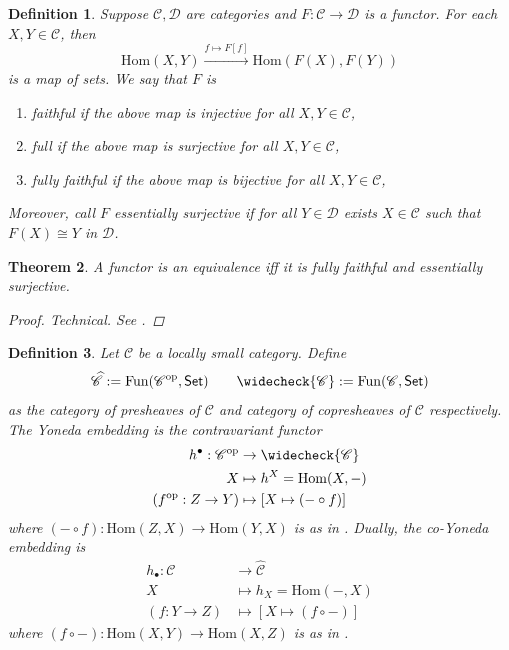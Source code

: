 \documentclass[10pt]{book}
\theoremstyle{bookplain}
\newtheorem{theorem}{Theorem}[section]
\theoremstyle{bookdefinition}
\newtheorem{definition}[theorem]{Definition}
\theoremstyle{bookremark}
\begin{document}
\begin{definition}Suppose $\mathscr{C}, \mathscr{D}$ are categories and $F:\mathscr{C}\rightarrow \mathscr{D}$ is a functor. 
    For each $X,Y\in\mathscr{C}$, then
    \[\mathrm{Hom}(X,Y)\xrightarrow{f\mapsto F[f]} \mathrm{Hom}(F(X),F(Y))\]
    is a map of sets. We say that $F$ is 
    \begin{enumerate}
        \item \textit{faithful} if the above map is injective for all $X,Y\in\mathscr{C}$,
        \item \textit{full} if the above map is surjective for all $X,Y\in\mathscr{C}$,
        \item \textit{fully faithful} if the above map is bijective for all $X,Y\in\mathscr{C}$,
    \end{enumerate}
    Moreover, call $F$ \textit{essentially surjective} if for all $Y\in \mathscr{D}$ exists $X\in\mathscr{C}$ such that $F(X)\cong Y$ in $\mathscr{D}$. 
\end{definition}
\begin{theorem}A functor is an equivalence iff it is fully faithful and essentially surjective. 
    \begin{proof}
        Technical. See \cite[Thm.~1.3.13, p.~22]{KashiwaraSchapira2006}.
    \end{proof}
\end{theorem}

\begin{definition}Let $\mathscr{C}$ be a locally small category. Define 
    \[\widehat{\mathscr{C}}:=\mathrm{Fun}(\mathscr{C}^{\mathrm{op}},\mathsf{Set})\qquad\widecheck{\mathscr{C}}:=\mathrm{Fun}(\mathscr{C},\mathsf{Set})\] 
    as the \textit{category of presheaves} of $\mathscr{C}$ and \textit{category of copresheaves} of $\mathscr{C}$ respectively.
    The \textit{Yoneda embedding} is the contravariant functor 
    \[\begin{aligned}
        h^{\bullet}:\mathscr{C}^{\mathrm{op}}&\rightarrow \widecheck{\mathscr{C}}\\
        X&\mapsto h^X=\mathrm{Hom}(X,-)\\
        (f^{\mathrm{op}}:Z\rightarrow Y)&\mapsto \left[X\mapsto (-\circ f)\right]
    \end{aligned}\]
    where $(-\circ f):\mathrm{Hom}(Z,X)\rightarrow \mathrm{Hom}(Y,X)$ is as in . 
    Dually, the \textit{co-Yoneda embedding} is
    \[\begin{aligned}
        h_{\bullet}:\mathscr{C}&\rightarrow \widehat{\mathscr{C}}\\
        X&\mapsto h_X=\mathrm{Hom}(-,X)\\
        (f:Y\rightarrow Z)&\mapsto \left[X\mapsto (f\circ -)\right]
    \end{aligned}\]
    where $(f\circ -):\mathrm{Hom}(X,Y)\rightarrow \mathrm{Hom}(X,Z)$ is as in .
    
\end{definition}
\end{document}
